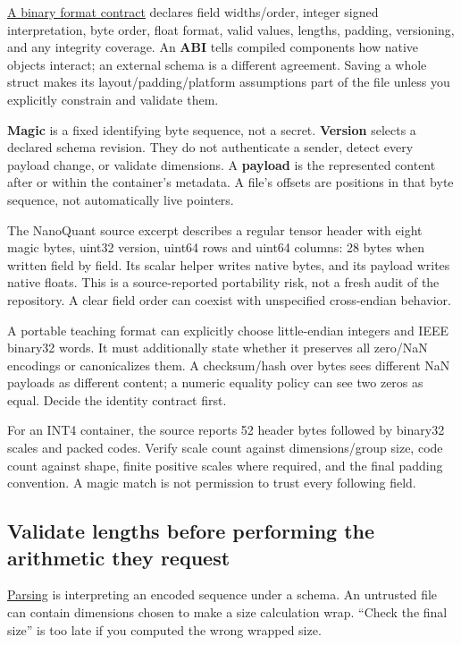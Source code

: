 \hyperref[appendix-590bbb2424c1]{A binary format contract} declares field widths/order, integer signed interpretation, byte order, float format, valid values, lengths, padding, versioning, and any integrity coverage. An \textbf{ABI} tells compiled components how native objects interact; an external schema is a different agreement. Saving a whole struct makes its layout/padding/platform assumptions part of the file unless you explicitly constrain and validate them.

\textbf{Magic} is a fixed identifying byte sequence, not a secret. \textbf{Version} selects a declared schema revision. They do not authenticate a sender, detect every payload change, or validate dimensions. A \textbf{payload} is the represented content after or within the container's metadata. A file's offsets are positions in that byte sequence, not automatically live pointers.

The NanoQuant source excerpt describes a regular tensor header with eight magic bytes, uint32 version, uint64 rows and uint64 columns: 28 bytes when written field by field. Its scalar helper writes native bytes, and its payload writes native floats. This is a source-reported portability risk, not a fresh audit of the repository. A clear field order can coexist with unspecified cross-endian behavior.

A portable teaching format can explicitly choose little-endian integers and IEEE binary32 words. It must additionally state whether it preserves all zero/NaN encodings or canonicalizes them. A checksum/hash over bytes sees different NaN payloads as different content; a numeric equality policy can see two zeros as equal. Decide the identity contract first.

For an INT4 container, the source reports 52 header bytes followed by binary32 scales and packed codes. Verify scale count against dimensions/group size, code count against shape, finite positive scales where required, and the final padding convention. A magic match is not permission to trust every following field.

\subsection{Validate lengths before performing the arithmetic they request}\label{01-foundations-i-ch002-validate-lengths-before-performing-the-arithmetic-they-request}

\hyperref[appendix-652d81568de9]{Parsing} is interpreting an encoded sequence under a schema. An untrusted file can contain dimensions chosen to make a size calculation wrap. ``Check the final size'' is too late if you computed the wrong wrapped size.

